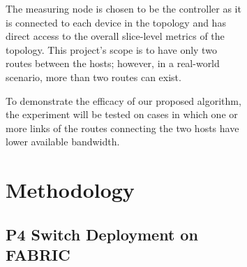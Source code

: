 \documentclass[conference]{IEEEtran}
\begin{document}
\begin{figure}[h!]
\begin{figure}[b]
    The measuring node is chosen to be the controller as it is connected to each device in the topology and has direct access to the overall slice-level metrics of the topology. This project's scope is to have only two routes between the hosts; however, in a real-world scenario, more than two routes can exist.

    To demonstrate the efficacy of our proposed algorithm, the experiment will be tested on cases in which one or more links of the routes connecting the two hosts have lower available bandwidth.




    \section{Methodology}
    \subsection{P4 Switch Deployment on FABRIC}


\end{figure}
\end{figure}
\end{document}
